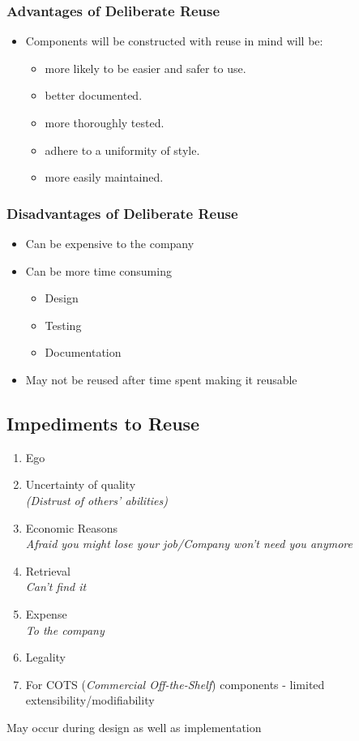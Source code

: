 \documentclass{report}
\begin{document}
				\subsubsection{Advantages of Deliberate Reuse}
					\begin{itemize}
						\item Components will be constructed with reuse in mind will be:
							\begin{itemize}
								\item more likely to be easier and safer to use.
								\item better documented.
								\item more thoroughly tested.
								\item adhere to a uniformity of style.
								\item more easily maintained.
							\end{itemize}
					\end{itemize}
				\subsubsection{Disadvantages of Deliberate Reuse}
					\begin{itemize}
						\item Can be expensive to the company
						\item Can be more time consuming
							\begin{itemize}
								\item Design
								\item Testing
								\item Documentation
							\end{itemize}
						\item May not be reused after time spent making it reusable
					\end{itemize}
			\subsection{Impediments to Reuse}
				\begin{enumerate}
					\item Ego
					\item Uncertainty of quality\\
						\textit{(Distrust of others' abilities)}
					\item Economic Reasons\\
						\textit{Afraid you might lose your job/Company won't need you anymore}
					\item Retrieval\\
						\textit{Can't find it}
					\item Expense\\
						\textit{To the company}
					\item Legality
					\item For COTS (\textit{Commercial Off-the-Shelf}) components - limited extensibility/modifiability
				\end{enumerate}
				May occur during design as well as implementation
\end{document}
